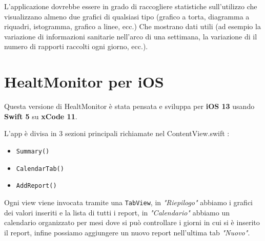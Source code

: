 \documentclass{article}
\begin{document}
L'applicazione dovrebbe essere in grado di raccogliere statistiche sull'utilizzo che visualizzano almeno due grafici di qualsiasi tipo (grafico a torta, diagramma a riquadri, istogramma, grafico a linee, ecc.) Che mostrano dati utili (ad esempio la variazione di informazioni sanitarie nell'arco di una settimana, la variazione di il numero di rapporti raccolti ogni giorno, ecc.).


\newpage
\section{HealtMonitor per iOS}

Questa versione di HealtMonitor è stata pensata e sviluppa per \textbf{iOS 13} usando \textbf{Swift 5} su \textbf{xCode 11}.

L'app è divisa in 3 sezioni principali richiamate nel ContentView.swift : 
\begin{itemize}
  \item \texttt{Summary()}
  \item \texttt{CalendarTab()}
  \item \texttt{AddReport() }
\end{itemize}

Ogni view viene invocata tramite una \texttt{TabView}, in \textit{"Riepilogo"} abbiamo i grafici dei valori inseriti e la lista di tutti i report, in \textit{"Calendario"} abbiamo un calendario organizzato per mesi dove si può controllare i giorni in cui si è inserito il report, infine possiamo aggiungere un nuovo report nell'ultima tab \textit{"Nuovo"}.

\medskip
\end{document}
